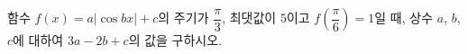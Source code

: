 함수 $f(x)=a|\cos bx|+c$의 주기가 $\dfrac{\pi}{3}$, 최댓값이 $5$이고 $f\!\left(\dfrac{\pi}{6}\right)=1$일 때, 상수 $a$, $b$, $c$에 대하여 $3a-2b+c$의 값을 구하시오. 
